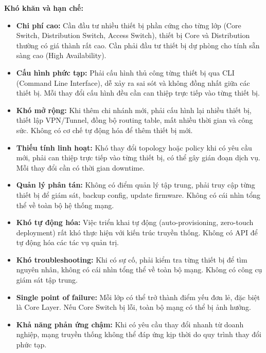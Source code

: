\textbf{Khó khăn và hạn chế:}
\begin{itemize}
    \item \textbf{Chi phí cao:} Cần đầu tư nhiều thiết bị phần cứng cho từng lớp (Core Switch, Distribution Switch, Access Switch), thiết bị Core và Distribution thường có giá thành rất cao. Cần phải đầu tư thiết bị dự phòng cho tính sẵn sàng cao (High Availability).
    \item \textbf{Cấu hình phức tạp:} Phải cấu hình thủ công từng thiết bị qua CLI (Command Line Interface), dễ xảy ra sai sót và không đồng nhất giữa các thiết bị. Mỗi thay đổi cấu hình đều cần can thiệp trực tiếp vào từng thiết bị.
    \item \textbf{Khó mở rộng:} Khi thêm chi nhánh mới, phải cấu hình lại nhiều thiết bị, thiết lập VPN/Tunnel, đồng bộ routing table, mất nhiều thời gian và công sức. Không có cơ chế tự động hóa để thêm thiết bị mới.
    \item \textbf{Thiếu tính linh hoạt:} Khó thay đổi topology hoặc policy khi có yêu cầu mới, phải can thiệp trực tiếp vào từng thiết bị, có thể gây gián đoạn dịch vụ. Mỗi thay đổi cần có thời gian downtime.
    \item \textbf{Quản lý phân tán:} Không có điểm quản lý tập trung, phải truy cập từng thiết bị để giám sát, backup config, update firmware. Không có cái nhìn tổng thể về toàn bộ hệ thống mạng.
    \item \textbf{Khó tự động hóa:} Việc triển khai tự động (auto-provisioning, zero-touch deployment) rất khó thực hiện với kiến trúc truyền thống. Không có API để tự động hóa các tác vụ quản trị.
    \item \textbf{Khó troubleshooting:} Khi có sự cố, phải kiểm tra từng thiết bị để tìm nguyên nhân, không có cái nhìn tổng thể về toàn bộ mạng. Không có công cụ giám sát tập trung.
    \item \textbf{Single point of failure:} Mỗi lớp có thể trở thành điểm yếu đơn lẻ, đặc biệt là Core Layer. Nếu Core Switch bị lỗi, toàn bộ mạng có thể bị ảnh hưởng.
    \item \textbf{Khả năng phản ứng chậm:} Khi có yêu cầu thay đổi nhanh từ doanh nghiệp, mạng truyền thống không thể đáp ứng kịp thời do quy trình thay đổi phức tạp.
\end{itemize}
